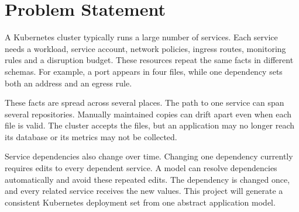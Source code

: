 \section{Problem Statement}
\label{sec:problem}

A Kubernetes cluster typically runs a large number of services. Each service
needs a workload, service account, network policies, ingress routes, monitoring
rules and a disruption budget. These resources repeat the same facts in
different schemas. For example, a port appears in four files, while one
dependency sets both an address and an egress rule.

These facts are spread across several places. The path to one service can span
several repositories. Manually maintained copies can drift apart even when
each file is valid. The cluster accepts the files, but an application may no
longer reach its database or its metrics may not be collected.

Service dependencies also change over time. Changing one dependency currently
requires edits to every dependent service. A model can resolve dependencies
automatically and avoid these repeated edits. The dependency is changed once,
and every related service receives the new values. This project will generate
a consistent Kubernetes deployment set from one abstract application model.
